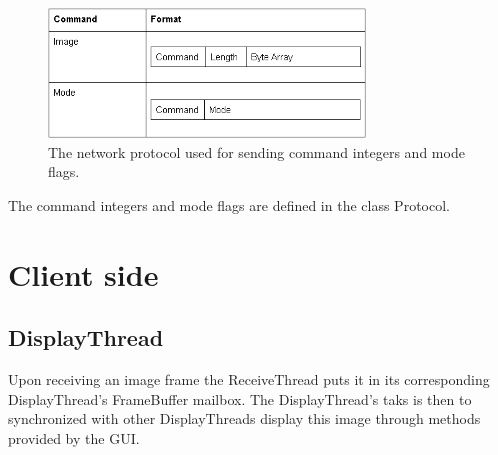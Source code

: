 \documentclass[8pt,titlepage]{article}
\begin{document}
%        
%        
%       
%        

\begin{figure}[hbp]
\centering
\includegraphics[width=0.75\textwidth]{../screenshots/tabell.png}
\caption{The network protocol used for sending command integers and mode flags.}
\end{figure}


\noindent The command integers and mode flags are defined in the class Protocol.


\section{Client side}

\subsection{DisplayThread}
Upon receiving an image frame the ReceiveThread puts it in its corresponding DisplayThread’s FrameBuffer mailbox. The DisplayThread’s taks is then to synchronized with other DisplayThreads display this image through methods provided by the GUI.
\end{document}
